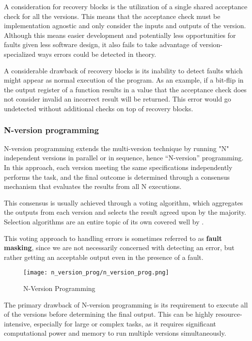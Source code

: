 A consideration for recovery blocks is the utilization of a single shared acceptance check for all the versions. This means that the acceptance check must be implementation agnostic and only consider the inputs and outputs of the version. Although this means easier development and potentially less opportunities for faults given less software design, it also fails to take advantage of version-specialized ways errors could be detected in theory.

A considerable drawback of recovery blocks is its inability to detect faults which might appear as normal execution of the program. As an example, if a bit-flip in the output register of a function results in a value that the acceptance check does not consider invalid an incorrect result will be returned. This error would go undetected without additional checks on top of recovery blocks.

\subsubsection{N-version programming}

N-version programming extends the multi-version technique by running "N" independent versions in parallel or in sequence, hence “N-version” programming. In this approach, each version meeting the same specifications independently performs the task, and the final outcome is determined through a consensus mechanism that evaluates the results from all N executions.

This consensus is usually achieved through a voting algorithm, which aggregates the outputs from each version and selects the result agreed upon by the majority. Selection algorithms are an entire topic of its own covered well by \cite{Aljarbouh_2021}.

This voting approach to handling errors is sometimes referred to as \textbf{fault masking}, since we are not necessarily concerned with detecting an error, but rather getting an acceptable output even in the presence of a fault.

\begin{figure}[hbt!]
    \centering
    \texttt{[image: n\_version\_prog/n\_version\_prog.png]}
    \caption{N-Version Programming}
\end{figure}

The primary drawback of N-version programming is its requirement to execute all of the versions before determining the final output. This can be highly resource-intensive, especially for large or complex tasks, as it requires significant computational power and memory to run multiple versions simultaneously.

